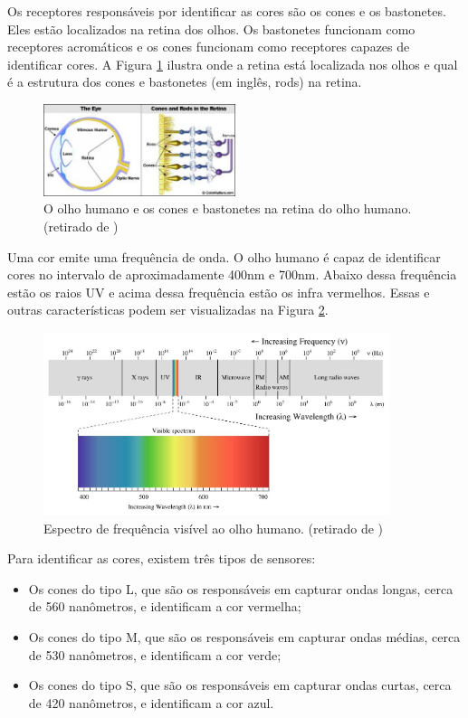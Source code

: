 \documentclass[	12pt, Times, openright, twoside, a4paper, english, brazil]{abntex2}
\begin{document}
Os receptores responsáveis por identificar as cores são os cones e os bastonetes. Eles estão localizados na retina dos olhos. Os bastonetes funcionam como receptores acromáticos e os cones funcionam como receptores capazes de identificar cores. A Figura  \ref{fig:figuraOlhoHumano} ilustra onde a retina está localizada nos olhos e qual é a estrutura dos cones e bastonetes (em inglês, rods) na retina.

\begin{figure}[!htb]
\centering \includegraphics[width=0.5\textwidth]{figuraOlhoHumano.jpg}
\caption{O olho humano e os cones e bastonetes na retina do olho humano. (retirado de ) \label{fig:figuraOlhoHumano}}
\end{figure}

Uma cor emite uma frequência de onda. O olho humano é capaz de identificar cores no intervalo de aproximadamente 400nm e 700nm. Abaixo dessa frequência estão os raios UV e acima dessa frequência estão os infra vermelhos. Essas e outras características podem ser visualizadas na Figura \ref{fig:figuraSpectro}.

\begin{figure}[!htb]
\centering
\includegraphics[width=0.9\textwidth]{figuraSpectro.jpg}
\caption{Espectro de frequência visível ao olho humano. (retirado de ) \label{fig:figuraSpectro}}
\end{figure}

Para identificar as cores, existem três tipos de sensores:

\begin{itemize}
\item Os cones do tipo L, que são os responsáveis em capturar ondas longas, cerca de 560 nanômetros, e identificam a cor vermelha;
\item Os cones do tipo M, que são os responsáveis em capturar ondas médias, cerca de 530 nanômetros, e identificam a cor verde;
\item Os cones do tipo S, que são os responsáveis em capturar ondas curtas, cerca de 420 nanômetros, e identificam a cor azul.
\end{itemize}
\end{document}
